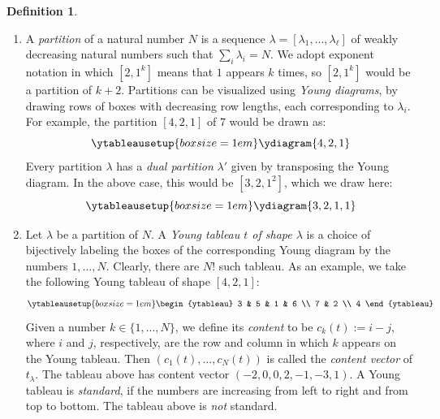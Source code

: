 \documentclass[11pt]{report}
\theoremstyle{definition}
\newtheorem{definition}[theorem]{Definition}
\theoremstyle{remark}
\theoremstyle{remark}
\begin{document}
\begin{definition}
\begin{enumerate}[label=(\roman*)]
\item A \emph{partition} of a natural number $N$ is a sequence $\lambda = [\lambda_1,...,\lambda_\ell]$ of weakly decreasing natural numbers such that $\sum_i \lambda_i = N$. We adopt exponent notation in which $[2,1^k]$ means that $1$ appears $k$ times, so $[2,1^k]$ would be a partition of $k+2$. Partitions can be visualized using \emph{Young diagrams}, by drawing rows of boxes with decreasing row lengths, each corresponding to $\lambda_i$. For example, the partition $[4,2,1]$ of $7$ would be drawn as:
\begin{equation*}
\ytableausetup{boxsize=1em}
\ydiagram{4,2,1}
\end{equation*}
Every partition $\lambda$ has a \emph{dual partition} $\lambda'$ given by transposing the Young diagram. In the above case, this would be $[3,2,1^2]$, which we draw here:
\begin{equation*}
\ytableausetup{boxsize=1em}
\ydiagram{3,2,1,1}
\end{equation*}
\item Let $\lambda$ be a partition of $N$. A \emph{Young tableau $t$ of shape $\lambda$} is a choice of bijectively labeling the boxes of the corresponding Young diagram by the numbers $1,...,N$. Clearly, there are $N!$ such tableau. As an example, we take the following Young tableau of shape $[4,2,1]$:
\begin{equation*}
\ytableausetup{boxsize=1em}
\begin{ytableau}
3 & 5 & 1 & 6 \\
7 & 2 \\
4
\end{ytableau}
\end{equation*}
Given a number $k \in \{ 1,...,N \}$, we define its \emph{content} to be $c_k(t) := i - j$, where $i$ and $j$, respectively, are the row and column in which $k$ appears on the Young tableau. Then $(c_1(t),...,c_N(t))$ is called the \emph{content vector} of $t_\lambda$. The tableau above has content vector $(-2,0,0,2,-1,-3,1)$. A Young tableau is \emph{standard}, if the numbers are increasing from left to right and from top to bottom. The tableau above is \emph{not} standard.

\end{enumerate}
\end{definition}
\end{document}
